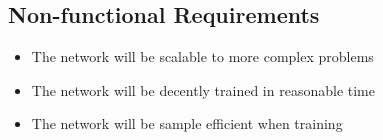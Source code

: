 \newcommand{\functionalrequirement}[5]{
 \begin{table}[htbp]
  \centering
  \begin{tabular}{lp{.7\linewidth}}              \toprule
   Input:  & #3                         \\ \midrule
   Output: & #4                         \\ \midrule
   \multicolumn{2}{p{.9\linewidth}}{#5} \\ \bottomrule
  \end{tabular}
  \caption{Functional requirement «#2»}
  \label{#1}
 \end{table}
}




\subsection{Non-functional Requirements}

\begin{itemize}
 \item The network will be scalable to more complex problems
 \item The network will be decently trained in reasonable time
 \item The network will be sample efficient when training
\end{itemize}


